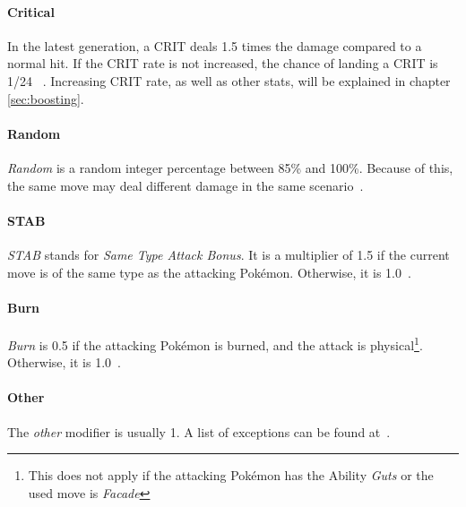 \paragraph{Critical}
In the latest generation, a \ac{CRIT} deals 1.5 times the damage compared to a normal hit.
If the \ac{CRIT} rate is not increased, the chance of landing a \ac{CRIT} is 1/24
~\autocite{Bulbapedia:CriticalHit}. Increasing \ac{CRIT} rate, as well as other stats, will 
be explained in chapter \ref{sec:boosting}.

\paragraph{Random}
\textit{Random} is a random integer percentage between 85\% and 100\%. Because of this, the same move
may deal different damage in the same scenario~\autocite{Bulbapedia:Damage}.

\paragraph{STAB}
\textit{STAB} stands for \textit{Same Type Attack Bonus}. It is a multiplier of 1.5 if the current move
is of the same type as the attacking Pokémon. Otherwise, it is 1.0~\autocite{Bulbapedia:Damage}.

\paragraph{Burn}
\textit{Burn} is 0.5 if the attacking Pokémon is burned, and the attack
is physical\footnote{This does not apply if the attacking Pokémon has the Ability \textit{Guts}
or the used move is \textit{Facade}}. Otherwise, it is 1.0~\autocite{Bulbapedia:Damage}.

\paragraph{Other}
The \textit{other} modifier is usually 1. A list of exceptions can be found at~\autocite{Bulbapedia:Damage}.


